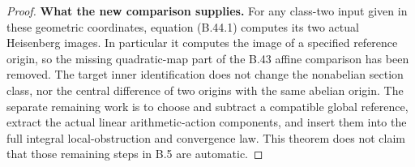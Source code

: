 \begin{proof}
\par\smallskip\noindent\textbf{What the new comparison supplies.}
For any class-two input given in these geometric coordinates,
equation (B.44.1) computes its two actual Heisenberg images.
In particular it computes the image of a specified reference
origin, so the missing quadratic-map part of the B.43 affine
comparison has been removed.  The target inner identification
does not change the nonabelian section class, nor the central
difference of two origins with the same abelian origin.
The separate remaining work is to choose and subtract a
compatible global reference, extract the actual linear
arithmetic-action components, and insert them into the full
integral local-obstruction and convergence law.  This theorem
does not claim that those remaining steps in B.5 are automatic.
\end{proof}
